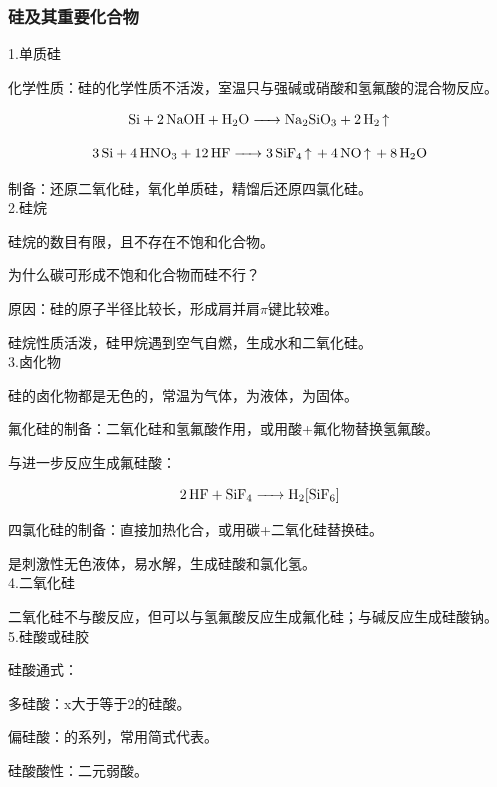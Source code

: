 \documentclass[a4paper,UTF8]{article}
\begin{document}
\subsubsection{硅及其重要化合物}

1.单质硅

化学性质：硅的化学性质不活泼，室温只与强碱或硝酸和氢氟酸的混合物反应。

$$ \ce{Si + 2NaOH + H2O -> Na2SiO3 + 2H2 ^} $$

$$ \ce{3Si + 4HNO3 + 12HF -> 3SiF4 ^ + 4NO ^ + 8H2O} $$

制备：还原二氧化硅，氧化单质硅，精馏后还原四氯化硅。\\

2.硅烷

硅烷的数目有限，且不存在不饱和化合物。

\begin{tcolorbox}

	为什么碳可形成不饱和化合物而硅不行？

	原因：硅的原子半径比较长，形成肩并肩$\pi$键比较难。

\end{tcolorbox}

硅烷性质活泼，硅甲烷遇到空气自燃，生成水和二氧化硅。\\

3.卤化物

硅的卤化物都是无色的，常温为气体，为液体，为固体。

氟化硅的制备：二氧化硅和氢氟酸作用，或用酸+氟化物替换氢氟酸。

与进一步反应生成氟硅酸：

$$ \ce{2HF + SiF4 -> H2[SiF6]} $$

四氯化硅的制备：直接加热化合，或用碳+二氧化硅替换硅。

是刺激性无色液体，易水解，生成硅酸和氯化氢。\\

4.二氧化硅

二氧化硅不与酸反应，但可以与氢氟酸反应生成氟化硅；与碱反应生成硅酸钠。\\

5.硅酸或硅胶

硅酸通式：

多硅酸：x大于等于2的硅酸。

偏硅酸：的系列，常用简式代表。

硅酸酸性：二元弱酸。
\end{document}
